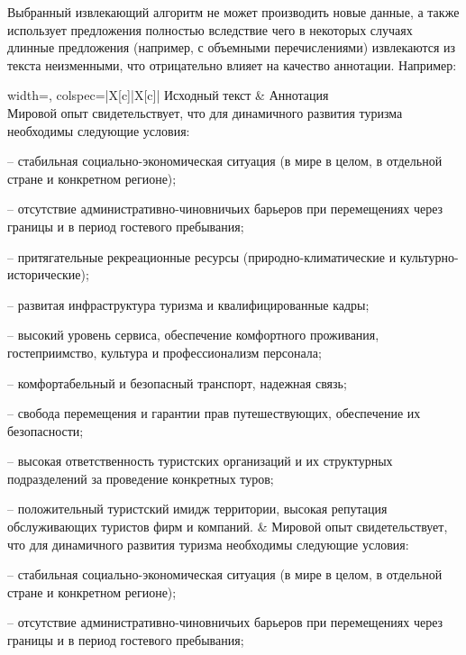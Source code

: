 \documentclass[12pt, a4paper]{article}
\begin{document}
    \begin{results}
     	Выбранный извлекающий алгоритм не может производить новые данные, а также использует предложения полностью вследствие чего в некоторых случаях длинные предложения (например, с объемными перечислениями) извлекаются из текста неизменными, что отрицательно влияет на качество аннотации. Например:
     	
     	\begin{center}
     		\begin{tblr}{ 
     				width=\linewidth,
     				colspec={|X[c]|X[c]|} 
     			} 
     			\hline
     			Исходный текст & Аннотация\\
     			\hline
     			Мировой опыт свидетельствует, что для динамичного развития туризма необходимы следующие условия:
     			
     			– стабильная социально-экономическая ситуация (в мире в целом, в отдельной стране и конкретном регионе);
     			
     			– отсутствие административно-чиновничьих барьеров при перемещениях через границы и в период гостевого пребывания;
     			
     			– притягательные рекреационные ресурсы (природно-климатические и культурно-исторические);
     			
     			– развитая инфраструктура туризма и квалифицированные кадры;
     			
     			– высокий уровень сервиса, обеспечение комфортного проживания, гостеприимство, культура и профессионализм персонала;
     			
     			– комфортабельный и безопасный транспорт, надежная связь;
     			
     			– свобода перемещения и гарантии прав путешествующих, обеспечение их безопасности;
     			
     			– высокая ответственность туристских организаций и их структурных подразделений за проведение конкретных туров;
     			
     			– положительный туристский имидж территории, высокая репутация обслуживающих туристов фирм и компаний. & Мировой опыт свидетельствует, что для динамичного развития туризма необходимы следующие условия: 
     			
     			– стабильная социально-экономическая ситуация (в мире в целом, в отдельной стране и конкретном регионе); 
     			
     			– отсутствие административно-чиновничьих барьеров при перемещениях через границы и в период гостевого пребывания; 
     			

\end{tblr}
\end{center}
\end{results}
\end{document}

